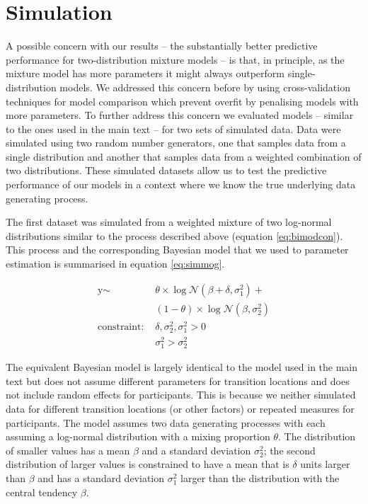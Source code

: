 \documentclass[
  man,floatsintext]{apa7}
\begin{document}
\newpage

\hypertarget{simulation}{%
\section{Simulation}\label{simulation}}

A possible concern with our results -- the substantially better predictive performance for two-distribution mixture models -- is that, in principle, as the mixture model has more parameters it might always outperform single-distribution models. We addressed this concern before by using cross-validation techniques for model comparison which prevent overfit by penalising models with more parameters. To further address this concern we evaluated models -- similar to the ones used in the main text -- for two sets of simulated data. Data were simulated using two random number generators, one that samples data from a single distribution and another that samples data from a weighted combination of two distributions. These simulated datasets allow us to test the predictive performance of our models in a context where we know the true underlying data generating process.

The first dataset was simulated from a weighted mixture of two log-normal distributions similar to the process described above (equation \ref{eq:bimodcon}). This process and the corresponding Bayesian model that we used to parameter estimation is summarised in equation \ref{eq:simmog}.

\begin{equation}
\begin{aligned}
\label{eq:simmog}
\text{y} \sim\text{ } & \theta \times \log\mathcal{N}(\beta + \delta, \sigma^2_1) +\\
& (1 - \theta) \times \log\mathcal{N}(\beta, \sigma^2_2)\\
\text{constraint: } & \delta, \sigma_\text{2}^2, \sigma_\text{1}^2>0\\
        & \sigma_{1}^2 > \sigma_{2}^2
\end{aligned}
\end{equation}

The equivalent Bayesian model is largely identical to the model used in the main text but does not assume different parameters for transition locations and does not include random effects for participants. This is because we neither simulated data for different transition locations (or other factors) or repeated measures for participants. The model assumes two data generating processes with each assuming a log-normal distribution with a mixing proportion \(\theta\). The distribution of smaller values has a mean \(\beta\) and a standard deviation \(\sigma^2_2\); the second distribution of larger values is constrained to have a mean that is \(\delta\) units larger than \(\beta\) and has a standard deviation \(\sigma^2_1\) larger than the distribution with the central tendency \(\beta\).
\end{document}
